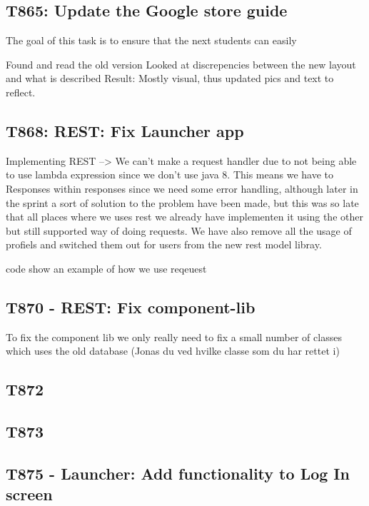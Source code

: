 \subsection{T865: Update the Google store guide}


The goal of this task is to ensure that the next students can easily 


Found and read the old version
Looked at discrepencies between the new layout and what is described
Result: Mostly visual, thus updated pics and text to reflect.

\subsection{T868: REST: Fix Launcher app}
Implementing REST --> We can't make a request handler due to not being able
to use lambda expression since we don't use java 8.
This means we have to Responses within responses since we need some error
handling, although later in the sprint a sort of solution to the problem have
been made, but this was so late that all places where we uses rest we already
have implementen it using the other but still supported way of doing requests.
We have also remove all the usage of profiels and switched them out for users
from the new rest model libray.

code show an example of how we use reqeuest

\subsection{T870 - REST: Fix component-lib}
To fix the component lib we only really need to fix a small number of classes
which uses the old database (Jonas du ved hvilke classe som du har rettet i)

\subsection{T872}

\subsection{T873}

\subsection{T875 - Launcher: Add functionality to Log In screen}

